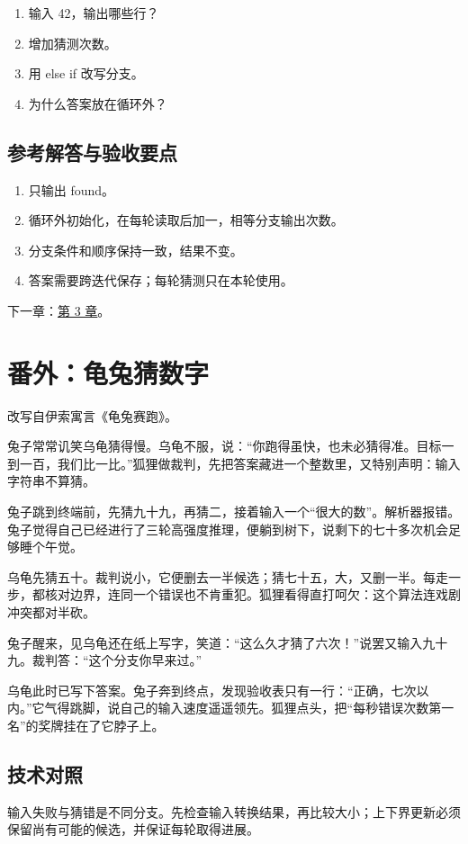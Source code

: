 \begin{enumerate}

\item 输入 42，输出哪些行？

\item 增加猜测次数。

\item 用 else if 改写分支。

\item 为什么答案放在循环外？

\end{enumerate}

\subsection*{参考解答与验收要点}

\begin{enumerate}

\item 只输出 found。

\item 循环外初始化，在每轮读取后加一，相等分支输出次数。

\item 分支条件和顺序保持一致，结果不变。

\item 答案需要跨迭代保存；每轮猜测只在本轮使用。

\end{enumerate}

下一章：\hyperref[ch:03]{第 3 章}。

\section{番外：龟兔猜数字}

改写自伊索寓言《龟兔赛跑》。

兔子常常讥笑乌龟猜得慢。乌龟不服，说：“你跑得虽快，也未必猜得准。目标一到一百，我们比一比。”狐狸做裁判，先把答案藏进一个整数里，又特别声明：输入字符串不算猜。

兔子跳到终端前，先猜九十九，再猜二，接着输入一个“很大的数”。解析器报错。兔子觉得自己已经进行了三轮高强度推理，便躺到树下，说剩下的七十多次机会足够睡个午觉。

乌龟先猜五十。裁判说小，它便删去一半候选；猜七十五，大，又删一半。每走一步，都核对边界，连同一个错误也不肯重犯。狐狸看得直打呵欠：这个算法连戏剧冲突都对半砍。

兔子醒来，见乌龟还在纸上写字，笑道：“这么久才猜了六次！”说罢又输入九十九。裁判答：“这个分支你早来过。”

乌龟此时已写下答案。兔子奔到终点，发现验收表只有一行：“正确，七次以内。”它气得跳脚，说自己的输入速度遥遥领先。狐狸点头，把“每秒错误次数第一名”的奖牌挂在了它脖子上。

\subsection*{技术对照}

输入失败与猜错是不同分支。先检查输入转换结果，再比较大小；上下界更新必须保留尚有可能的候选，并保证每轮取得进展。
